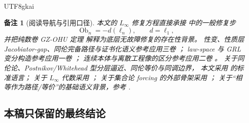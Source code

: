 \documentclass[12pt]{article}
\newtheorem{remark}{备注}[section]
\newcommand{\Linfty}{\ensuremath{L_\infty}}
\newcommand{\Layer}{\ell}
\newcommand{\Ob}{\operatorname{Ob}}
\begin{document}
\begin{CJK*}{UTF8}{gkai}
\begin{remark}[阅读导航与引用口径]
本文的 \Linfty{} 修复方程直接承接
\cite{RepoTex12LinftyRepair} 中的一般修复步
\[
  \Ob_n=-d(\Layer_n),
  \qquad d=\Layer_1,
\]
并把纯数卷 GZ-OHU 定理 \cite{GaoZhengPureMath} 解释为底层无故障修复的存在性背景。
性变、性质层 Jacobiator-gap、同伦完备路径与证书化语义参考应用三卷 \cite{GaoZhengAppVol3}；
law-space 与 GRL 变分构造参考应用一卷 \cite{GaoZhengAppVol1}；
连续本体与离散工程像的区分参考应用二卷 \cite{GaoZhengAppVol2}。
关于同伦论、Postnikov/Whitehead 型分层逼近、同伦等价与同调边界，
本文采用 \cite{Hatcher2002AT,Whitehead1978Elements,Weibel1994HomologicalAlgebra} 的标准语言；
关于 \Linfty{} 代数采用 \cite{LadaStasheff1993,LadaMarkl1995,LodayVallette2012}；
关于集合论 forcing 的外部骨架采用 \cite{Cohen1963,Jech2003,SEPSetTheory,EOMForcing}；
关于“相等作为路径/等价”的基础语义背景，参考 \cite{HoTTBook}.
\end{remark}

\subsection{本稿只保留的最终结论}
\label{subsec:tex50-final-only}


\end{CJK*}
\end{document}
